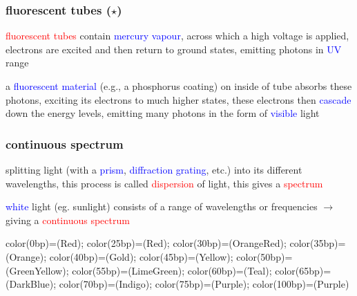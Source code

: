 \documentclass[12pt,xcolor=svgnames,handout]{beamer}
\newcommand{\keypoint}[1]{%
   \textcolor{red}{#1}%
}
\newcommand{\tightframetitle}[1]{ %
\frametitle{#1}\vspace{-.6\baselineskip}}
\begin{document}
\begin{frame}
	\tightframetitle{fluorescent tubes ($\star$)}
	
	\begin{block}{}
		\keypoint{fluorescent tubes} contain \textcolor{blue}{mercury vapour}, across which a high voltage is applied, electrons are excited and then return to ground states, emitting photons in \textcolor{blue}{UV} range
	\end{block}
	
	\begin{block}{}
		a \textcolor{blue}{fluorescent material} (e.g., a phosphorus coating) on inside of tube absorbs these photons, exciting its electrons to much higher states, these electrons then \textcolor{blue}{cascade} down the energy levels, emitting many photons in the form of \textcolor{blue}{visible} light
	\end{block}
	
\end{frame}


\begin{frame}
\tightframetitle{continuous spectrum}

\begin{block}{}
splitting light (with a \textcolor{blue}{prism}, \textcolor{blue}{diffraction grating}, etc.) into its different wavelengths, this process is called \keypoint{dispersion} of light, this gives a \keypoint{spectrum}
\end{block}

\begin{block}{}
\textcolor{blue}{white} light (eg. sunlight) consists of a range of wavelengths or frequencies $\longrightarrow$ giving a \keypoint{continuous spectrum}
\end{block}

\begin{block}{}
\centering
{}
{color(0bp)=(Red); color(25bp)=(Red); color(30bp)=(OrangeRed); color(35bp)=(Orange); color(40bp)=(Gold); color(45bp)=(Yellow); color(50bp)=(GreenYellow); color(55bp)=(LimeGreen); color(60bp)=(Teal); color(65bp)=(DarkBlue); color(70bp)=(Indigo); color(75bp)=(Purple); color(100bp)=(Purple)}
\end{block}

\end{frame}
\end{document}
